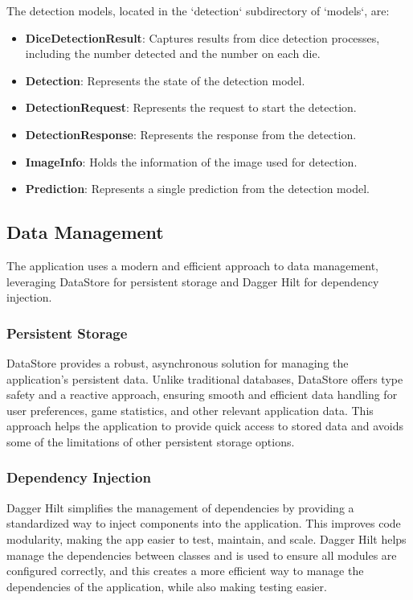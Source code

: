 The detection models, located in the `detection` subdirectory of `models`, are:

\begin{itemize}
    \item \textbf{DiceDetectionResult}: Captures results from dice detection processes, including the number detected and the number on each die.
    \item \textbf{Detection}: Represents the state of the detection model.
    \item \textbf{DetectionRequest}: Represents the request to start the detection.
    \item \textbf{DetectionResponse}: Represents the response from the detection.
    \item \textbf{ImageInfo}: Holds the information of the image used for detection.
    \item \textbf{Prediction}: Represents a single prediction from the detection model.
\end{itemize}

\subsection{Data Management}

The application uses a modern and efficient approach to data management, leveraging DataStore for persistent storage and Dagger Hilt for dependency injection.

\subsubsection{Persistent Storage}

DataStore provides a robust, asynchronous solution for managing the application's persistent data. Unlike traditional databases, DataStore offers type safety and a reactive approach, ensuring smooth and efficient data handling for user preferences, game statistics, and other relevant application data. This approach helps the application to provide quick access to stored data and avoids some of the limitations of other persistent storage options.

\subsubsection{Dependency Injection}
Dagger Hilt simplifies the management of dependencies by providing a standardized way to inject components into the application. This improves code modularity, making the app easier to test, maintain, and scale. Dagger Hilt helps manage the dependencies between classes and is used to ensure all modules are configured correctly, and this creates a more efficient way to manage the dependencies of the application, while also making testing easier.


